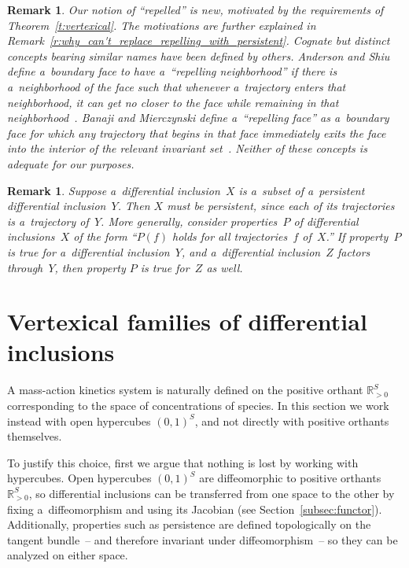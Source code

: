 \documentclass[pdftex]{sigma}
\newtheorem{Remark}[Theorem]{Remark}
\begin{document}
\begin{Remark}
\label{r:repelled}
Our notion of ``repelled'' is new, motivated by the requirements of Theorem~\ref{t:vertexical}.
The motivations are further explained in Remark~\ref{r:why_can't_replace_repelling_with_persistent}.
Cognate but distinct concepts bearing similar names have been def\/ined by others.
Anderson and Shiu def\/ine a~boundary face to have a~``repelling neighborhood'' if there is a~neighborhood of the face
such that whenever a~trajectory enters that neighborhood, it can get no closer to the face while remaining in that
neighborhood~\cite{AndersonShiu10}.
Banaji and Mierczynski def\/ine a~``repelling face'' as a~boundary face for which any trajectory that begins in that
face immediately exits the face into the interior of the relevant invariant set~\cite{BanajiMier}.
Neither of these concepts is adequate for our purposes.
\end{Remark}
\begin{Remark}
\label{r:subsetTrajectory}
Suppose a~dif\/ferential inclusion~$X$ is a~subset of a~persistent dif\/ferential inclusion~$Y$.
Then $X$ must be persistent, since each of its trajectories is a~trajectory of~$Y$.
More generally, consider properties~$P$ of dif\/ferential inclusions~$X$ of the form ``$P(f)$ holds for all
trajectories~$f$ of~$X$.'' If property~$P$ is true for a~dif\/ferential inclusion~$Y$, and a~dif\/ferential
inclusion~$Z$ factors through~$Y$, then property $P$ is true for~$Z$ as well.
\end{Remark}

\section{Vertexical families of dif\/ferential inclusions}
\label{s:vertexical}

A mass-action kinetics system is naturally def\/ined on the positive orthant $\mathbb{R}_{>0}^S$ corresponding to the
space of concentrations of species.
In this section we work instead with open hypercubes $(0,1)^S$, and not directly with positive orthants themselves.

To justify this choice, f\/irst we argue that nothing is lost by working with hypercubes.
Open hypercubes $(0,1)^S$ are dif\/feomorphic to positive orthants $\mathbb{R}_{>0}^S$, so dif\/ferential inclusions can
be transferred from one space to the other by f\/ixing a~dif\/feomorphism and using its Jacobian (see
Section~\ref{subsec:functor}).
Additionally, properties such as persistence are def\/ined topologically on the tangent bundle~-- and therefore
invariant under dif\/feomorphism~-- so they can be analyzed on either space.
\end{document}
